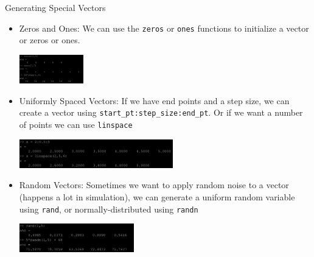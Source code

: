 {}\documentclass[letterpaper,
compress,
xcolor=x11names,
]{beamer}
\begin{document}

\begin{frame}{Generating Special Vectors}
	\footnotesize
	\begin{itemize}
		\item Zeros and Ones: We can use the \texttt{zeros} or \texttt{ones} functions to initialize a vector or zeros or ones.
		\begin{center}
			\includegraphics[height = 1.25cm]{ones_and_zeros.png}
		\end{center}
		\item Uniformly Spaced Vectors: If we have end points and a step size, we can create a vector using \texttt{start\_pt:step\_size:end\_pt}. Or if we want a number of points we can use \texttt{linspace}
		\begin{center}
			\includegraphics[height = 1.25cm]{uniform_vectors.png}
		\end{center}
		\item Random Vectors: Sometimes we want to apply random noise to a vector (happens a lot in simulation), we can generate a uniform random variable using \texttt{rand}, or normally-distributed using \texttt{randn}
		\begin{center}
			\includegraphics[height = 1.25cm]{random_vectors.png}
		\end{center}
	\end{itemize}
\end{frame}

\end{document}
